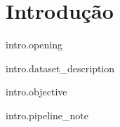 \section{Introdu\c{c}\~{a}o}

{{ intro.opening }}

{{ intro.dataset_description }}

{{ intro.objective }}

{{ intro.pipeline_note }}

